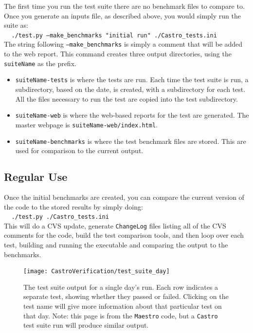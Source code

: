 The first time you run the test suite there are no benchmark files to compare to.
Once you generate an inputs file, as described above, you would simply run the
suite as: \\
$~~~~~${\tt ./test.py --make\_benchmarks "initial run" ./Castro\_tests.ini} \\
The string following {\tt --make\_benchmarks} is simply a comment that will
be added to the web report.
This command creates three output directories, using the {\tt suiteName} as the prefix.
\begin{itemize}
\item {\tt suiteName-tests} is where the tests are run.  Each time the test
 suite is run, a subdirectory, based on the date, is created, with a subdirectory
 for each test.  All the files necessary to run the test are copied into the
 test subdirectory.

\item {\tt suiteName-web} is where the web-based reports for the test are generated.
 The master webpage is {\tt suiteName-web/index.html}.

\item {\tt suiteName-benchmarks} is where the test benchmark files are stored.  This
 are used for comparison to the current output.
\end{itemize}



\subsection{Regular Use}

Once the initial benchmarks are created, you can compare the current
version of the code to the stored results by simply doing: \\
$~~~~~${\tt ./test.py ./Castro\_tests.ini} \\ 
This will do a CVS update, generate {\tt ChangeLog} files listing all
of the CVS comments for the code, build the test comparison tools, and
then loop over each test, building and running the executable and
comparing the output to the benchmarks.

\begin{figure}[t]
\centering
\texttt{[image: CastroVerification/test\_suite\_day]}
\caption{\label{fig:test_suite_date} The test suite output for a
  single day's run.  Each row indicates a separate test, showing
  whether they passed or failed.  Clicking on the test name will give
  more information about that particular test on that day. Note: this
  page is from the {\tt Maestro} code, but a {\tt Castro} test suite
  run will produce similar output.}
\end{figure}

